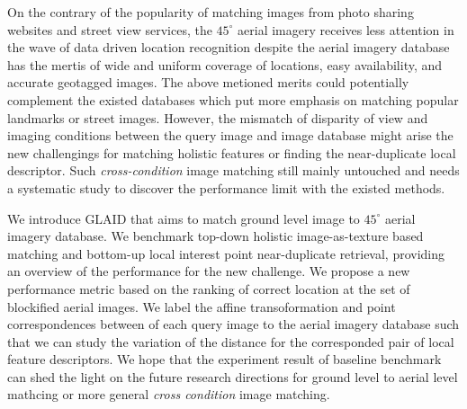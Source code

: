 
On the contrary of the popularity of matching images from photo sharing websites and street view services, the $45^\circ$ aerial imagery receives less attention in the wave of data driven location recognition despite the aerial imagery database has the mertis of wide and uniform coverage of locations, easy availability, and accurate geotagged images.  The above metioned merits could potentially complement the existed databases which put more emphasis on matching popular landmarks or street images.  However, the mismatch of disparity of view and imaging conditions between the query image and image database might arise the new challengings for matching holistic features or finding the near-duplicate local descriptor.  Such \emph{cross-condition} image matching still mainly untouched and needs a systematic study to discover the performance limit with the existed methods.




We introduce GLAID that aims to match ground level image to $45^\circ$ aerial imagery database. We benchmark top-down holistic image-as-texture based matching and bottom-up local interest point near-duplicate retrieval, providing an overview of the performance for the new challenge.  We propose a new performance metric based on the ranking of correct location at the set of blockified aerial images.  We label the affine transoformation and point correspondences between of each query image to the aerial imagery database such that we can study the variation of the distance for the corresponded pair of local feature descriptors.  We hope that the experiment result of baseline benchmark can shed the light on the future research directions for ground level to aerial level mathcing or more general \emph{cross condition} image matching.
 
